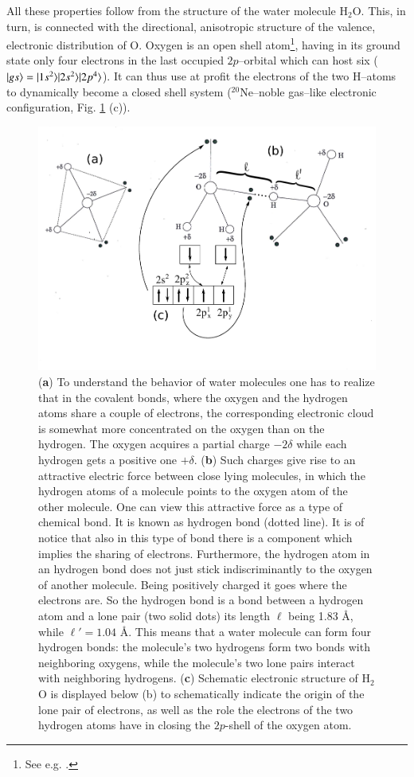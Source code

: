 \begin{subappendices}
All these properties follow from the structure of the water molecule H$_2$O. This, in turn, is connected with the directional, anisotropic structure of the valence, electronic distribution of O. Oxygen is an open shell atom\footnote{See e.g. \cite{Greiner:98}.}, having in its ground state only four electrons in the last occupied $2p$--orbital which can host six ($|{gs} \rangle=|{1s^2} \rangle|{2s^2} \rangle|{2p^4} \rangle$). It can thus use at profit the electrons of the two H--atoms to dynamically become a closed shell system ($^{20}$Ne--noble gas--like electronic configuration, Fig. \ref{fig6G5} (c)). 
\begin{figure}
\centerline{\includegraphics[width=13cm]{C8/figsC8/fig6G5.pdf}}
\caption{(\textbf{a}) To understand the behavior of water molecules one has to realize that in the covalent bonds, where the oxygen and the hydrogen atoms share a couple of electrons, the corresponding electronic cloud is somewhat more concentrated on the oxygen than on the hydrogen. The oxygen acquires a partial charge $-2\delta$ while each hydrogen gets a positive one $+\delta$. (\textbf{b}) Such charges give rise to an attractive electric force between  close lying molecules, in which the hydrogen atoms of a molecule points to the oxygen atom of the other molecule. One can view this attractive force as a type of chemical bond. It is known as hydrogen bond (dotted line). It is of notice that also in this type of bond there is a component which implies the sharing of electrons. Furthermore, the hydrogen atom in an hydrogen bond does not just stick indiscriminantly to the  oxygen of another molecule. Being positively charged it goes where the electrons are. So the hydrogen bond is a bond between a hydrogen atom and a lone pair (two solid dots) its length $\ell$ being 1.83 \AA, while $\ell'=1.04$ \AA. This means that a water molecule can form four hydrogen bonds: the molecule's two hydrogens form two bonds with neighboring oxygens, while the molecule's two lone pairs interact with neighboring hydrogens. (\textbf{c}) Schematic electronic structure of H$_2$O is displayed below (b) to schematically indicate the origin of the lone pair of electrons, as well as the role the electrons of the two hydrogen atoms have in closing the $2p$-shell of the oxygen atom.}\label{fig6G5}

\end{figure}
\end{subappendices}
